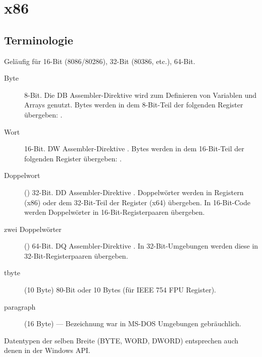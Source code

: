 \section{x86}

\subsection{Terminologie}

Geläufig für 16-Bit (8086/80286), 32-Bit (80386, etc.), 64-Bit.

\begin{description}
	\item[Byte] 8-Bit.
		Die DB Assembler-Direktive wird zum Definieren von Variablen und Arrays genutzt.
		Bytes werden in dem 8-Bit-Teil der folgenden Register übergeben:
		.
	\item[Wort] 16-Bit.
		DW Assembler-Direktive \dittoclosing.
		Bytes werden in dem 16-Bit-Teil der folgenden Register übergeben:
			.
	\item[Doppelwort] () 32-Bit.
		DD Assembler-Direktive \dittoclosing.
		Doppelwörter werden in Registern (x86) oder dem 32-Bit-Teil der Register (x64) übergeben.
		In 16-Bit-Code werden Doppelwörter in 16-Bit-Registerpaaren übergeben.
	\item[zwei Doppelwörter] () 64-Bit.
		DQ Assembler-Direktive \dittoclosing.
		In 32-Bit-Umgebungen werden diese in 32-Bit-Registerpaaren übergeben.
	\item[tbyte] (10 Byte) 80-Bit oder 10 Bytes (für IEEE 754 FPU Register).
	\item[paragraph] (16 Byte) --- Bezeichnung war in MS-DOS Umgebungen gebräuchlich.
\end{description}


Datentypen der selben Breite (BYTE, WORD, DWORD) entsprechen auch denen in der Windows \ac{API}.

